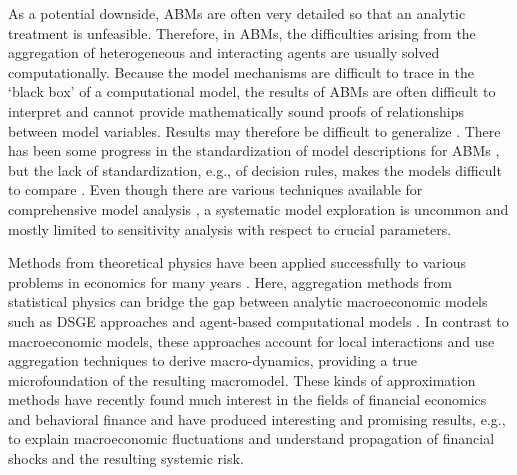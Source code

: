 As a potential downside, ABMs are often very detailed so that an analytic treatment is unfeasible. 
Therefore, in ABMs, the difficulties arising from the aggregation of heterogeneous and interacting agents are usually solved computationally.
Because the model mechanisms are difficult to trace in the `black box' of a computational model, the results of ABMs are often difficult to interpret and cannot provide mathematically sound proofs of relationships between model variables. Results may therefore be difficult to generalize \citep{Leombruni2005}.
There has been some progress in the standardization of model descriptions for ABMs \citep{Grimm2006}, but the lack of standardization, e.g., of decision rules, makes the models difficult to compare \citep[][p. 239]{Hamill2015}. Even though there are various techniques available for comprehensive model analysis \citep{Lee2015}, a systematic model exploration is uncommon and mostly limited to sensitivity analysis with respect to crucial parameters.

Methods from theoretical physics have been applied successfully to various problems in economics for many years \citep{Mantegna1999}. Here, aggregation methods from statistical physics can bridge the gap between analytic macroeconomic models such as DSGE approaches and agent-based computational models \citep[for a review of physics methods in social modeling, see ref.][]{castellano2009statistical}. In contrast to macroeconomic models, these approaches account for local interactions and use aggregation techniques to derive macro-dynamics, providing a true microfoundation of the resulting macromodel.
These kinds of approximation methods have recently found much interest in the fields of financial economics \citep{DiGuilmi2008, DiGuilmi2012a, Chiarella2011a} and behavioral finance \citep{Hommes2017BoomsPrices} and have produced interesting and promising results, e.g., to explain macroeconomic fluctuations and understand propagation of financial shocks and the resulting systemic risk.



